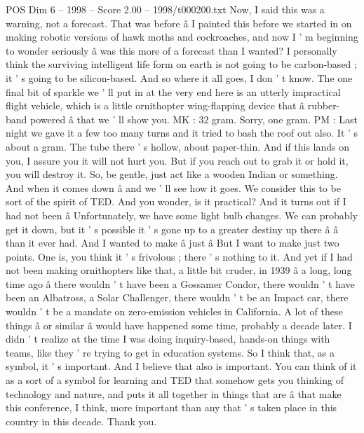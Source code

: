 \begin{textsample}{POS Dim 6 – 1998 – Score 2.00 – 1998/t000200.txt}
Now, I said this was a warning, not a forecast.
That was before â I painted this before we started in on making robotic versions of hawk moths and cockroaches, and now I ' m beginning to wonder seriously â was this more of a forecast than I wanted?
I personally think the surviving intelligent life form on earth is not going to be carbon-based ; it ' s going to be silicon-based.
And so where it all goes, I don ' t know.
The one final bit of sparkle we ' ll put in at the very end here is an utterly impractical flight vehicle, which is a little ornithopter wing-flapping device that â rubber-band powered â that we ' ll show you.
MK : 32 gram.
Sorry, one gram.
PM : Last night we gave it a few too many turns and it tried to bash the roof out also.
It ' s about a gram.
The tube there ' s hollow, about paper-thin.
And if this lands on you, I assure you it will not hurt you.
But if you reach out to grab it or hold it, you will destroy it.
So, be gentle, just act like a wooden Indian or something.
And when it comes down â and we ' ll see how it goes.
We consider this to be sort of the spirit of TED.
And you wonder, is it practical?
And it turns out if I had not been â Unfortunately, we have some light bulb changes.
We can probably get it down, but it ' s possible it ' s gone up to a greater destiny up there â â than it ever had.
And I wanted to make â just â But I want to make just two points.
One is, you think it ' s frivolous ; there ' s nothing to it.
And yet if I had not been making ornithopters like that, a little bit cruder, in 1939 â a long, long time ago â there wouldn ' t have been a Gossamer Condor, there wouldn ' t have been an Albatross, a Solar Challenger, there wouldn ' t be an Impact car, there wouldn ' t be a mandate on zero-emission vehicles in California.
A lot of these things â or similar â would have happened some time, probably a decade later.
I didn ' t realize at the time I was doing inquiry-based, hands-on things with teams, like they ' re trying to get in education systems.
So I think that, as a symbol, it ' s important.
And I believe that also is important.
You can think of it as a sort of a symbol for learning and TED that somehow gets you thinking of technology and nature, and puts it all together in things that are â that make this conference, I think, more important than any that ' s taken place in this country in this decade.
Thank you.

\end{textsample}
